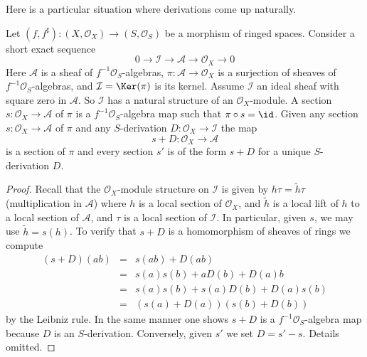 \noindent
Here is a particular situation where derivations come up
naturally.

\begin{lemma}
\label{lemma-double-structure-gives-derivation}
Let $(f, f^\sharp) : (X, \mathcal{O}_X) \to (S, \mathcal{O}_S)$
be a morphism of ringed spaces. Consider a short exact sequence
$$
0 \to \mathcal{I} \to \mathcal{A} \to \mathcal{O}_X \to 0
$$
Here $\mathcal{A}$ is a sheaf of $f^{-1}\mathcal{O}_S$-algebras,
$\pi : \mathcal{A} \to \mathcal{O}_X$ is a surjection
of sheaves of $f^{-1}\mathcal{O}_S$-algebras, and
$\mathcal{I} = \Ker(\pi)$ is its kernel. Assume $\mathcal{I}$ an ideal
sheaf with square zero in $\mathcal{A}$. So $\mathcal{I}$
has a natural structure of an $\mathcal{O}_X$-module.
A section $s : \mathcal{O}_X \to \mathcal{A}$ of $\pi$
is a $f^{-1}\mathcal{O}_S$-algebra map such that $\pi \circ s = \id$.
Given any section $s : \mathcal{O}_X \to \mathcal{A}$
of $\pi$ and any $S$-derivation $D : \mathcal{O}_X \to \mathcal{I}$
the map
$$
s + D : \mathcal{O}_X \to \mathcal{A}
$$
is a section of $\pi$ and every section $s'$ is of the form $s + D$
for a unique $S$-derivation $D$.
\end{lemma}

\begin{proof}
Recall that the $\mathcal{O}_X$-module structure on $\mathcal{I}$
is given by $h \tau = \tilde h \tau$ (multiplication in $\mathcal{A}$)
where $h$ is a local section of $\mathcal{O}_X$, and
$\tilde h$ is a local lift of $h$ to a local
section of $\mathcal{A}$, and $\tau$ is a local section of $\mathcal{I}$.
In particular, given $s$, we may use $\tilde h = s(h)$.
To verify that $s + D$ is a homomorphism of sheaves of rings we
compute
\begin{eqnarray*}
(s + D)(ab) & = & s(ab) + D(ab) \\
& = & s(a)s(b) + aD(b) + D(a)b \\
& = & s(a) s(b) + s(a)D(b) + D(a)s(b) \\
& = & (s(a) + D(a))(s(b) + D(b))
\end{eqnarray*}
by the Leibniz rule. In the same manner one shows
$s + D$ is a $f^{-1}\mathcal{O}_S$-algebra
map because $D$ is an $S$-derivation. Conversely, given $s'$ we set
$D = s' - s$. Details omitted.
\end{proof}

